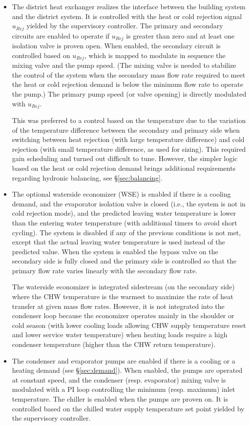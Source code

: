 \begin{itemize}
    \item The district heat exchanger realizes the interface between the building system and the district system.
    It is controlled with the heat or cold rejection signal $u_{Rej}$ yielded by the supervisory controller.
    The primary and secondary circuits are enabled to operate if $u_{Rej}$ is greater than zero and at least one isolation valve is proven open.
    When enabled, the secondary circuit is controlled based on $u_{Rej}$, which is mapped to modulate in sequence the mixing valve and the pump speed. (The mixing valve is needed to stabilize the control of the system when the secondary mass flow rate required to meet the heat or cold rejection demand is below the minimum flow rate to operate the pump.)
    The primary pump speed (or valve opening) is directly modulated with $u_{Rej}$.

    This was preferred to a control based on the temperature due to the variation of the temperature difference between the secondary and primary side when switching between heat rejection (with large temperature difference) and cold rejection (with small temperature difference, as used for sizing). This required gain scheduling and turned out difficult to tune. However, the simpler logic based on the heat or cold rejection demand brings additional requirements regarding hydronic balancing, see §\ref{sec:balancing}.

    \item The optional waterside economizer (WSE) is enabled if there is a cooling demand, and the evaporator isolation valve is closed (i.e., the system is not in cold rejection mode), and the predicted leaving water temperature is lower than the entering water temperature (with additional timers to avoid short cycling). The system is disabled if any of the previous conditions is not met, except that the actual leaving water temperature is used instead of the predicted value.
    When the system is enabled the bypass valve on the secondary side is fully closed and the primary side is controlled so that the primary flow rate varies linearly with the secondary flow rate.

    The waterside economizer is integrated sidestream (on the secondary side) where the CHW temperature is the warmest to maximize the rate of heat transfer at given mass flow rates. However, it is not integrated into the condenser loop because the economizer operates mainly in the shoulder or cold season (with lower cooling loads allowing CHW supply temperature reset and lower service water temperature) when heating loads require a high condenser temperature (higher than the CHW return temperature).

    \item The condenser and evaporator pumps are enabled if there is a cooling or a heating demand (see §\ref{sec:demand}). When enabled, the pumps are operated at constant speed, and the condenser (resp. evaporator) mixing valve is modulated with a PI loop controlling the minimum (resp. maximum) inlet temperature. The chiller is enabled when the pumps are proven on. It is controlled based on the chilled water supply temperature set point yielded by the supervisory controller.
\end{itemize}

